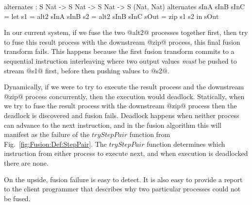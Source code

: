 \begin{code}
  alternates : S Nat -> S Nat -> S Nat -> S (Nat, Nat)
  alternates sInA sInB sInC
   = let  s1   = alt2 sInA sInB
          s2   = alt2 sInB sInC
          sOut = zip s1 s2
     in   sOut
\end{code}

In our current system, if we fuse the two @alt2@ processes together first, then try to fuse this result process with the downstream @zip@ process, this final fusion transform fails. This happens because the first fusion transform commits to a sequential instruction interleaving where two output values \emph{must} be pushed to stream @s1@ first, before then pushing values to @s2@.

Dynamically, if we were to try to execute the result process and the downstream @zip@ process concurrently, then the execution would deadlock. Statically, when we try to fuse the result process with the downstream @zip@ process then the deadlock is discovered and fusion fails. Deadlock happens when neither process can advance to the next instruction, and in the fusion algorithm this will manifest as the failure of the $tryStepPair$ function from Fig.~\ref{fig:Fusion:Def:StepPair}. The $tryStepPair$ function determines which instruction from either process to execute next, and when execution is deadlocked there are none.

On the upside, fusion failure is easy to detect. It is also easy to provide a report to the client programmer that describes why two particular processes could not be fused. 



